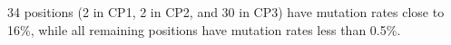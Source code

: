 34 positions (2 in CP1, 2 in CP2, and 30 in CP3) have mutation rates close to 16\%, while all remaining positions have mutation rates less than 0.5\%.\endinput